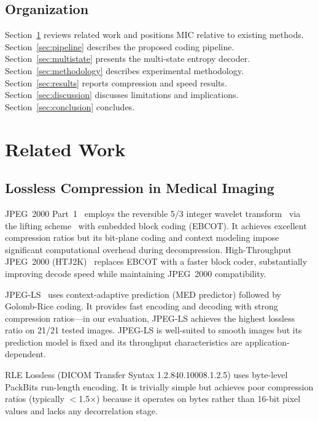 \documentclass[journal]{IEEEtran}
\begin{document}
\subsection{Organization}

Section~\ref{sec:related} reviews related work and positions MIC relative to
existing methods. Section~\ref{sec:pipeline} describes the proposed coding
pipeline. Section~\ref{sec:multistate} presents the multi-state entropy decoder.
Section~\ref{sec:methodology} describes experimental methodology.
Section~\ref{sec:results} reports compression and speed results.
Section~\ref{sec:discussion} discusses limitations and implications.
Section~\ref{sec:conclusion} concludes.

\section{Related Work}
\label{sec:related}

\subsection{Lossless Compression in Medical Imaging}

JPEG~2000 Part~1~\cite{taubman2002} employs the reversible 5/3 integer wavelet
transform~\cite{legall1988,calderbank1998} via the lifting scheme~\cite{sweldens1996,daubechies1998}
with embedded block coding (EBCOT). It achieves excellent compression
ratios but its bit-plane coding and context modeling impose significant
computational overhead during decompression. High-Throughput JPEG~2000
(HTJ2K)~\cite{htj2k2019,taubman2022} replaces EBCOT with a faster block coder,
substantially improving decode speed while maintaining JPEG~2000 compatibility.

JPEG-LS~\cite{loco1,jpegls2} uses context-adaptive prediction (MED predictor) followed
by Golomb-Rice coding. It provides fast encoding and decoding with strong
compression ratios---in our evaluation, JPEG-LS achieves the highest lossless
ratio on 21/21 tested images. JPEG-LS is well-suited to smooth images but its
prediction model is fixed and its throughput characteristics are
application-dependent.

RLE Lossless (DICOM Transfer Syntax 1.2.840.10008.1.2.5) uses byte-level
PackBits run-length encoding. It is trivially simple but achieves poor
compression ratios (typically $<$1.5$\times$) because it operates on bytes
rather than 16-bit pixel values and lacks any decorrelation stage.
\end{document}

